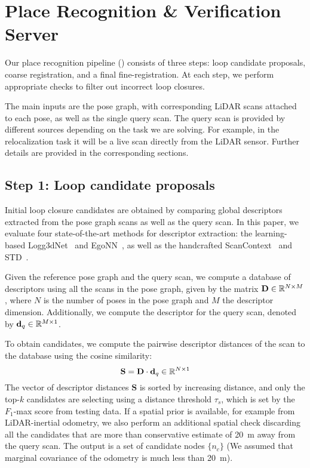 \section{Place Recognition \& Verification Server} \label{sec:pipeline}
Our place recognition pipeline () consists of three steps: loop candidate proposals, coarse registration, and a final fine-registration. At each step, we perform appropriate checks to filter out incorrect loop closures.

The main inputs are the pose graph, with corresponding LiDAR scans attached to each pose, as well as the single query scan. The query scan is provided by different sources depending on the task we are solving. For example, in the relocalization task it will be a live scan directly from the LiDAR sensor. Further details are provided in the corresponding sections.

\subsection*{\textbf{Step 1: Loop candidate proposals}}
\label{subsubsec:loop-candidate}
Initial loop closure candidates are obtained by comparing global descriptors extracted from the pose graph scans as well as the query scan. In this paper, we evaluate four state-of-the-art methods for descriptor extraction: the learning-based Logg3dNet~\cite{vidanapathirana2022icra} and EgoNN~\cite{komorowski2022ral}, as well as the handcrafted ScanContext~\cite{kim2018iros} and STD~\cite{yuan2023icra}.

Given the reference pose graph and the query scan, we compute a database of descriptors using all the scans in the pose graph, given by the matrix $\mathbf{D} \in \mathbb{R}^{N\times M}$, where $N$ is the number of poses in the pose graph and $M$ the descriptor dimension. Additionally, we compute the descriptor for the query scan, denoted by $\mathbf{d}_{q} \in \mathbb{R}^{M \times 1}$. 

To obtain candidates, we compute the pairwise descriptor distances of the scan to the database using the cosine similarity:
\begin{equation}
  \mathbf{S} = \mathbf{D} \cdot \mathbf{d}_{q} \in \mathbb{R}^{N \times 1}
\end{equation}
The vector of descriptor distances $\mathbf{S}$ is sorted by increasing distance, and only the top-$k$ candidates are selecting using a distance threshold $\tau_{s}$, which is set by the $F_1$-max score from testing data.
If a spatial prior is available, for example from LiDAR-inertial odometry, we also perform an additional spatial check discarding all the candidates that are more than conservative estimate of \SI{20}{\meter} away from the query scan. The output is a set of candidate nodes $\{ n_c\}$ (We assumed that marginal covariance of the odometry is much less than \SI{20}{\meter}).


